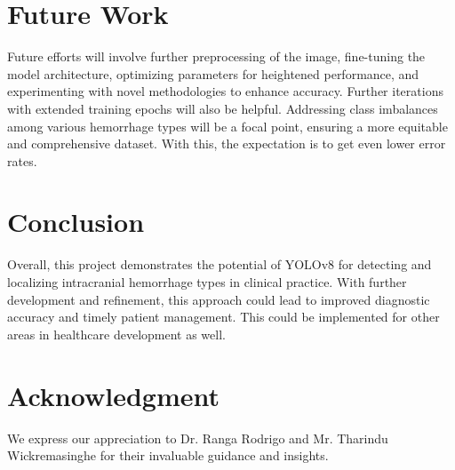 \documentclass[Print]{../Style/isecure-v24}
\begin{document}
\newpage

\section{Future Work} \label{sec: Future Work}
Future efforts will involve further preprocessing of the image, fine-tuning the model architecture, optimizing parameters for heightened performance, and experimenting with novel methodologies to enhance accuracy. Further iterations with extended training epochs will also be helpful. Addressing class imbalances among various hemorrhage types will be a focal point, ensuring a more equitable and comprehensive dataset. With this, the expectation is to get even lower error rates.



\section{Conclusion}\label{sec:conclusion}
Overall, this project demonstrates the potential of YOLOv8 for detecting and localizing intracranial hemorrhage types in clinical practice. With further development and refinement, this approach could lead to improved diagnostic accuracy and timely patient management. This could be implemented for other areas in healthcare development as well. 

\section*{Acknowledgment}

We express our appreciation to Dr. Ranga Rodrigo and Mr. Tharindu Wickremasinghe for their invaluable guidance and insights.
\end{document}

